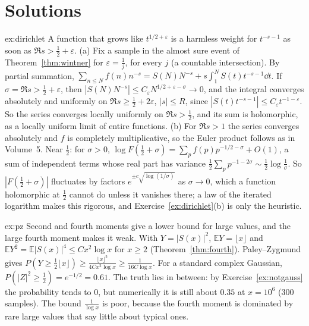 \section{Solutions}

\begin{solution}{ex:dirichlet}
\idea A function that grows like $t^{1/2+\varepsilon}$ is a harmless weight for $t^{-s-1}$ as soon as $\Re s>\frac12+\varepsilon$.
\writeup (a) Fix a sample in the almost sure event of Theorem~\ref{thm:wintner} for $\varepsilon=\frac1j$, for every $j$ (a countable intersection). By partial summation, $\sum_{n\le N}f(n)n^{-s}=S(N)N^{-s}+s\int_1^NS(t)t^{-s-1}\dd t$. If $\sigma=\Re s>\frac12+\varepsilon$, then $|S(N)N^{-s}|\le C_\varepsilon N^{1/2+\varepsilon-\sigma}\to0$, and the integral converges absolutely and uniformly on $\Re s\ge\frac12+2\varepsilon$, $|s|\le R$, since $|S(t)t^{-s-1}|\le C_\varepsilon t^{-1-\varepsilon}$. So the series converges locally uniformly on $\Re s>\frac12$, and its sum is holomorphic, as a locally uniform limit of entire functions. (b) For $\Re s>1$ the series converges absolutely and $f$ is completely multiplicative, so the Euler product follows as in Volume~5. Near $\frac12$: for $\sigma>0$, $\log F(\frac12+\sigma)=\sum_pf(p)p^{-1/2-\sigma}+O(1)$, a sum of independent terms whose real part has variance $\frac12\sum_pp^{-1-2\sigma}\sim\frac12\log\frac1\sigma$. So $|F(\frac12+\sigma)|$ fluctuates by factors $e^{\pm c\sqrt{\log(1/\sigma)}}$ as $\sigma\to0$, which a function holomorphic at $\frac12$ cannot do unless it vanishes there; a law of the iterated logarithm makes this rigorous, and Exercise~\ref{ex:dirichlet}(b) is only the heuristic.
\end{solution}

\begin{solution}{ex:pz}
\idea Second and fourth moments give a lower bound for large values, and the large fourth moment makes it weak.
\writeup With $Y=|S(x)|^2$, $\mathbb EY=\lfloor x\rfloor$ and $\mathbb EY^2=\mathbb E|S(x)|^4\le Cx^2\log x$ for $x\ge2$ (Theorem~\ref{thm:fourth}). Paley--Zygmund gives $P(Y\ge\frac12\lfloor x\rfloor)\ge\frac{\lfloor x\rfloor^2}{4Cx^2\log x}\ge\frac1{16C\log x}$. For a standard complex Gaussian, $P(|Z|^2\ge\frac12)=e^{-1/2}=0.61$. The truth lies in between: by Exercise~\ref{ex:notgauss} the probability tends to $0$, but numerically it is still about $0.35$ at $x=10^6$ ($300$ samples). The bound $\frac1{\log x}$ is poor, because the fourth moment is dominated by rare large values that say little about typical ones.
\end{solution}

